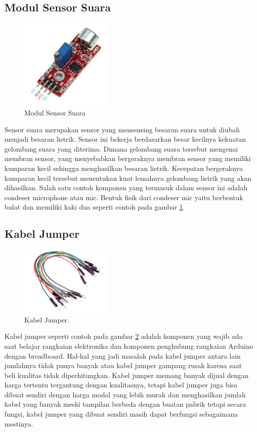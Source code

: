\subsection{Modul Sensor Suara}
\begin{figure}[ht]
\centerline{\includegraphics[width=0.4\textwidth]{figures/sssensorsuara.png}}
\caption{Modul Sensor Suara}
\label{sssensorsuara}
\end{figure}
Sensor suara merupakan sensor yang mensensing besaran suara untuk diubah menjadi besaran listrik. Sensor ini bekerja berdasarkan besar kecilnya kekuatan gelombang suara yang diterima. Dimana gelombang suara tersebut mengenai membran sensor, yang menyebabkan bergeraknya membran sensor yang memiliki kumparan kecil sehingga menghasilkan besaran listrik. Kecepatan bergeraknya kumparan kecil tersebut menentukan kuat lemahnya gelombang listrik yang akan dihasilkan. Salah satu contoh komponen yang termasuk dalam sensor ini adalah condeser microphone atau mic. Bentuk fisik dari condeser mic yaitu berbentuk bulat dan memiliki kaki dua seperti contoh pada gambar \ref{sssensorsuara}.
\subsection{Kabel Jumper}
\begin{figure}[ht]
\centerline{\includegraphics[width=0.4\textwidth]{figures/kabeljumper.jpg}}
\caption{Kabel Jumper.}
\label{kabeljumper}
\end{figure}
Kabel jumper seperti contoh pada gambar \ref{kabeljumper} adalah komponen yang wajib ada saat belajar rangkaian elektronika dan komponen penghubung rangkaian Arduino dengan breadboard. Hal-hal yang jadi masalah pada kabel jumper antara lain jumlahnya tidak punya banyak atau kabel jumper gampang rusak karena saat beli kualitas tidak diperhitungkan.
Kabel jumper memang banyak dijual dengan harga tertentu tergantung dengan kualitasnya, tetapi kabel jumper juga bisa dibuat sendiri dengan harga modal yang lebih murah dan menghasilkan jumlah kabel yang banyak meski tampilan berbeda dengan buatan pabrik tetapi secara fungsi, kabel jumper yang dibuat sendiri masih dapat berfungsi sebagaimana mestinya.

